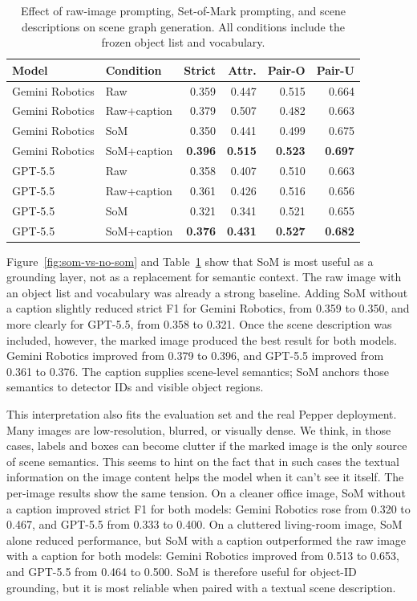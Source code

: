 \begin{table}[!htbp]
\centering
\scriptsize
\caption[Effect of SoM and scene descriptions.]{Effect of raw-image prompting, Set-of-Mark prompting, and scene descriptions on scene graph generation. All conditions include the frozen object list and vocabulary.}\label{tab:som-vs-no-som}
\begin{tabularx}{\linewidth}{@{}lXrrrr@{}}
\toprule
Model & Condition & Strict & Attr. & Pair-O & Pair-U \\
\midrule
Gemini Robotics & Raw & 0.359 & 0.447 & 0.515 & 0.664 \\
Gemini Robotics & Raw+caption & 0.379 & 0.507 & 0.482 & 0.663 \\
Gemini Robotics & SoM & 0.350 & 0.441 & 0.499 & 0.675 \\
Gemini Robotics & SoM+caption & \textbf{0.396} & \textbf{0.515} & \textbf{0.523} & \textbf{0.697} \\
GPT-5.5 & Raw & 0.358 & 0.407 & 0.510 & 0.663 \\
GPT-5.5 & Raw+caption & 0.361 & 0.426 & 0.516 & 0.656 \\
GPT-5.5 & SoM & 0.321 & 0.341 & 0.521 & 0.655 \\
GPT-5.5 & SoM+caption & \textbf{0.376} & \textbf{0.431} & \textbf{0.527} & \textbf{0.682} \\
\bottomrule
\end{tabularx}
\end{table}

Figure~\ref{fig:som-vs-no-som} and Table~\ref{tab:som-vs-no-som} show that SoM is most useful as a grounding layer, not as a replacement for semantic context. The raw image with an object list and vocabulary was already a strong baseline. Adding SoM without a caption slightly reduced strict F1 for Gemini Robotics, from 0.359 to 0.350, and more clearly for GPT-5.5, from 0.358 to 0.321. Once the scene description was included, however, the marked image produced the best result for both models. Gemini Robotics improved from 0.379 to 0.396, and GPT-5.5 improved from 0.361 to 0.376. The caption supplies scene-level semantics; SoM anchors those semantics to detector IDs and visible object regions.

This interpretation also fits the evaluation set and the real Pepper deployment. Many images are low-resolution, blurred, or visually dense. We think, in those cases, labels and boxes can become clutter if the marked image is the only source of scene semantics. This seems to hint on the fact that in such cases the textual information on the image content helps the model when it can't see it itself. The per-image results show the same tension. On a cleaner office image, SoM without a caption improved strict F1 for both models: Gemini Robotics rose from 0.320 to 0.467, and GPT-5.5 from 0.333 to 0.400. On a cluttered living-room image, SoM alone reduced performance, but SoM with a caption outperformed the raw image with a caption for both models: Gemini Robotics improved from 0.513 to 0.653, and GPT-5.5 from 0.464 to 0.500. SoM is therefore useful for object-ID grounding, but it is most reliable when paired with a textual scene description.

